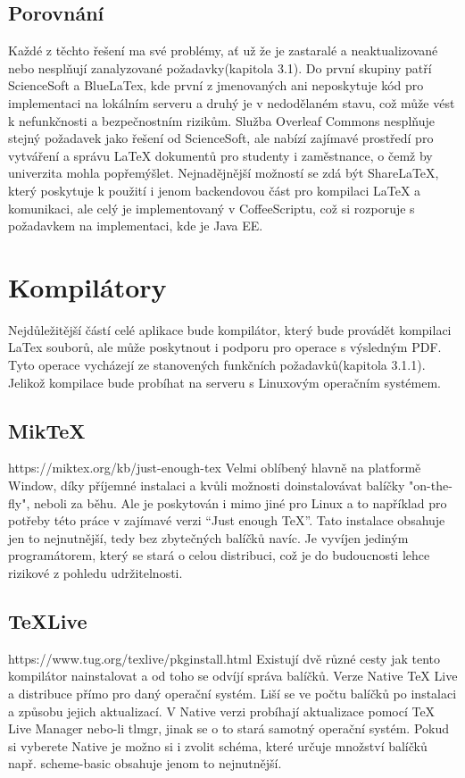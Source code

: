 \subsection{Porovnání}
Každé z těchto řešení ma své problémy, ať už že je zastaralé a neaktualizované nebo nesplňují zanalyzované požadavky(kapitola 3.1). Do první skupiny patří ScienceSoft a BlueLaTex, kde první z jmenovaných ani neposkytuje kód pro implementaci na lokálním serveru a druhý je v nedodělaném stavu, což může vést k nefunkčnosti a bezpečnostním rizikům. Služba Overleaf Commons nesplňuje stejný požadavek jako řešení od ScienceSoft, ale nabízí zajímavé prostředí pro vytváření a správu LaTeX dokumentů pro studenty i zaměstnance, o čemž by univerzita mohla popřemýšlet. Nejnadějnější možností se zdá být ShareLaTeX, který poskytuje k použití i jenom backendovou část pro kompilaci LaTeX a komunikaci, ale celý je implementovaný v CoffeeScriptu, což si rozporuje s požadavkem na implementaci, kde je Java EE. 

\section{Kompilátory}
Nejdůležitější částí celé aplikace bude kompilátor, který bude provádět kompilaci LaTex souborů, ale může poskytnout i podporu pro operace s výsledným PDF. Tyto operace vycházejí ze stanovených funkčních požadavků(kapitola 3.1.1). Jelikož kompilace bude probíhat na serveru s Linuxovým operačním systémem.

\subsection{MikTeX}
https://miktex.org/kb/just-enough-tex
Velmi oblíbený hlavně na platformě Window, díky příjemné instalaci a kvůli možnosti doinstalovávat balíčky "on-the-fly", neboli za běhu. Ale je poskytován i mimo jiné pro Linux a to například pro potřeby této práce v zajímavé verzi “Just enough TeX”. Tato instalace obsahuje jen to nejnutnější, tedy bez zbytečných balíčků navíc. Je vyvíjen jediným programátorem, který se stará o celou distribuci, což je do budoucnosti lehce rizikové z pohledu udržitelnosti. 

\subsection{TeXLive}
https://www.tug.org/texlive/pkginstall.html
Existují dvě různé cesty jak tento kompilátor nainstalovat a od toho se odvíjí správa balíčků. Verze Native TeX Live a distribuce přímo pro daný operační systém. Liší se ve počtu balíčků po instalaci a způsobu jejich aktualizací. V Native verzi probíhají aktualizace pomocí TeX Live Manager nebo-li tlmgr, jinak se o to stará samotný operační systém. Pokud si vyberete Native je možno si i zvolit schéma, které určuje množství balíčků např. scheme-basic obsahuje jenom to nejnutnější. 

